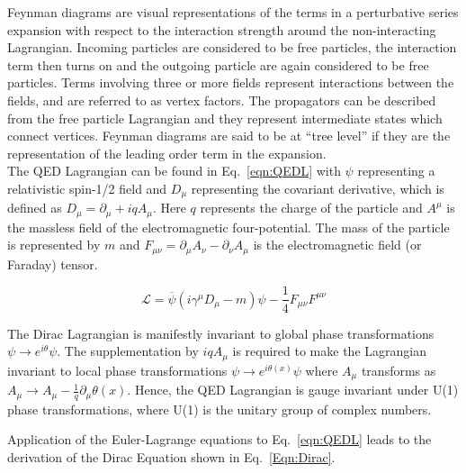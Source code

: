 Feynman diagrams are visual representations of the terms in a perturbative series expansion with respect to the interaction strength around the non-interacting Lagrangian. Incoming particles are considered to be free particles, the interaction term then turns on and the outgoing particle are again considered to be free particles. Terms involving three or more fields represent interactions between the fields, and are referred to as vertex factors. The propagators can be described from the free particle Lagrangian and they represent intermediate states which connect vertices. Feynman diagrams are said to be at ``tree level'' if they are the representation of the leading order term in the expansion.\\
The QED Lagrangian can be found in Eq.~\ref{eqn:QEDL} with $\psi$ representing a relativistic spin-1/2 field and $D_{\mu}$ representing the covariant derivative, which is defined as $D_{\mu} = \partial_{\mu} + iqA_{\mu}$. Here $q$ represents the charge of the particle and $A^{\mu}$ is the massless field of the electromagnetic four-potential. The mass of the particle is represented by $m$ and $F_{\mu\nu} = \partial_{\mu}A_{\nu} - \partial_{\nu}A_{\mu}$ is the electromagnetic field (or Faraday) tensor.

\begin{equation}
\mathcal{L} = \overline{\psi}\left(i\gamma^{\mu}D_{\mu}-m\right)\psi - \frac{1}{4}F_{\mu\nu}F^{\mu\nu}
\label{eqn:QEDL}
\end{equation}

The Dirac Lagrangian is manifestly invariant to global phase transformations $\psi \rightarrow e^{i\theta} \psi$. The supplementation by $iqA_{\mu}$ is required to make the Lagrangian invariant to local phase transformations $\psi \rightarrow e^{i\theta(x)} \psi$ where $A_{\mu}$ transforms as $A_{\mu} \rightarrow A_{\mu} - \frac{1}{q} \partial_{\mu}\theta(x)$. Hence, the QED Lagrangian is gauge invariant under U(1) phase transformations, where U(1) is the unitary group of complex numbers. 


Application of the Euler-Lagrange equations to Eq.~\ref{eqn:QEDL} leads to the derivation of the Dirac Equation shown in Eq.~\ref{Eqn:Dirac}.

